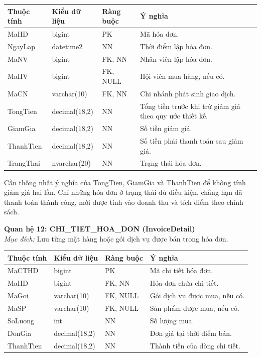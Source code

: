 \documentclass[11pt, a4paper]{article}
\begin{document}
\begin{small}
\begin{tabularx}{\textwidth}{| C{2.8cm} | C{2.4cm} | C{2.2cm} | Y |}
\hline
\textbf{Thuộc tính} & \textbf{Kiểu dữ liệu} & \textbf{Ràng buộc} & \textbf{Ý nghĩa} \\
\hline
MaHD & bigint & PK & Mã hóa đơn. \\
\hline
NgayLap & datetime2 & NN & Thời điểm lập hóa đơn. \\
\hline
MaNV & bigint & FK, NN & Nhân viên lập hóa đơn. \\
\hline
MaHV & bigint & FK, NULL & Hội viên mua hàng, nếu có. \\
\hline
MaCN & varchar(10) & FK, NN & Chi nhánh phát sinh giao dịch. \\
\hline
TongTien & decimal(18,2) & NN & Tổng tiền trước khi trừ giảm giá theo quy ước thiết kế. \\
\hline
GiamGia & decimal(18,2) & NN & Số tiền giảm giá. \\
\hline
ThanhTien & decimal(18,2) & NN & Số tiền phải thanh toán sau giảm giá. \\
\hline
TrangThai & nvarchar(20) & NN & Trạng thái hóa đơn. \\
\hline
\end{tabularx}
\end{small}

Cần thống nhất ý nghĩa của TongTien, GiamGia và ThanhTien để không tính giảm giá hai lần. Chỉ những hóa đơn ở trạng thái đủ điều kiện, chẳng hạn đã thanh toán thành công, mới được tính vào doanh thu và tích điểm theo chính sách.

\vspace{0.8em}
\textbf{Quan hệ 12: CHI\_TIET\_HOA\_DON (InvoiceDetail)} \\
\textit{Mục đích:} Lưu từng mặt hàng hoặc gói dịch vụ được bán trong hóa đơn.

\begin{small}
\begin{tabularx}{\textwidth}{| C{2.8cm} | C{2.4cm} | C{2.2cm} | Y |}
\hline
\textbf{Thuộc tính} & \textbf{Kiểu dữ liệu} & \textbf{Ràng buộc} & \textbf{Ý nghĩa} \\
\hline
MaCTHD & bigint & PK & Mã chi tiết hóa đơn. \\
\hline
MaHD & bigint & FK, NN & Hóa đơn chứa chi tiết. \\
\hline
MaGoi & varchar(10) & FK, NULL & Gói dịch vụ được mua, nếu có. \\
\hline
MaSP & varchar(10) & FK, NULL & Sản phẩm được mua, nếu có. \\
\hline
SoLuong & int & NN & Số lượng mua. \\
\hline
DonGia & decimal(18,2) & NN & Đơn giá tại thời điểm bán. \\
\hline
ThanhTien & decimal(18,2) & NN & Thành tiền của dòng chi tiết. \\
\hline
\end{tabularx}
\end{small}
\end{document}
